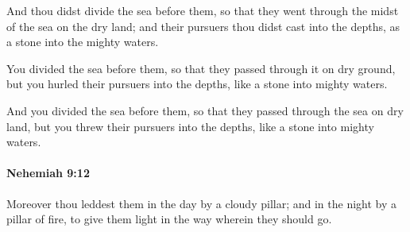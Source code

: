 			\begin{versebox}
					\item[BHS] 
					\item[LXX] 
					\item[ASV] And thou didst divide the sea before them, so that they went through the midst of the sea on the dry land; and their pursuers thou didst cast into the depths, as a stone into the mighty waters.
					\item[NIV] You divided the sea before them, so that they passed through it on dry ground, but you hurled their pursuers into the depths, like a stone into mighty waters.
					\item[NRSV] And you divided the sea before them, so that they passed through the sea on dry land, but you threw their pursuers into the depths, like a stone into mighty waters.
			\end{versebox}

		\paragraph{Nehemiah 9:12} %
			\label{NEHEMIAH-9-12}

			Moreover thou leddest them in the day by a cloudy pillar; and in the night by a pillar of fire, to give them light in the way wherein they should go.

